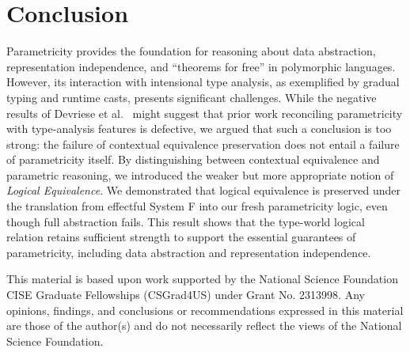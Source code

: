 \documentclass[acmsmall]{acmart}
\begin{document}
\section{Conclusion}
Parametricity provides the foundation for reasoning about data abstraction, representation independence, and “theorems for free” in polymorphic languages. However, its interaction with intensional type analysis, as exemplified by gradual typing and runtime casts, presents significant challenges. While the negative results of Devriese et al.~\cite{TwoParamVSThreeUniv} might suggest that prior work reconciling parametricity with type-analysis features is defective, we argued that such a conclusion is too strong: the failure of contextual equivalence preservation does not entail a failure of parametricity itself. By distinguishing between contextual equivalence and parametric reasoning, we introduced the weaker but more appropriate notion of \emph{Logical Equivalence}. We demonstrated that logical equivalence is preserved under the translation from effectful System F into our fresh parametricity logic, even though full abstraction fails. This result shows that the type-world logical relation retains sufficient strength to support the essential guarantees of parametricity, including data abstraction and representation independence.


\begin{acks}
This material is based upon work supported by the National Science Foundation CISE Graduate Fellowships (CSGrad4US) under Grant No. 2313998. Any opinions, findings, and conclusions or recommendations expressed in this material are those of the author(s) and do not necessarily reflect the views of the National Science Foundation.
\end{acks}





\end{document}
